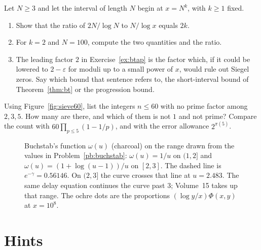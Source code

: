\begin{exercise}[$\star\star$]\label{ex:tworatio}
Let $N\ge3$ and let the interval of length $N$ begin at $x=N^k$, with $k\ge1$ fixed.
\begin{enumerate}[label=(\alph*)]
\item Show that the ratio of $2N/\log N$ to $N/\log x$ equals $2k$.
\item For $k=2$ and $N=100$, compute the two quantities and the ratio.
\item The leading factor $2$ in Exercise~\ref{ex:btap} is the factor which, if it could be lowered to $2-\varepsilon$ for moduli up to a small power of $x$, would rule out Siegel zeros. Say which bound that sentence refers to, the short-interval bound of Theorem~\ref{thm:bt} or the progression bound.
\end{enumerate}
\end{exercise}

\begin{exercise}[$\star$]\label{ex:sift60}
Using Figure~\ref{fig:sieve60}, list the integers $n\le60$ with no prime factor among $2,3,5$. How many are there, and which of them is not $1$ and not prime? Compare the count with $60\prod_{p\le5}(1-1/p)$, and with the error allowance $2^{\pi(5)}$.
\end{exercise}

\begin{figure}[ht]
\centering
{}
\caption{Buchstab's function $\omega(u)$ (charcoal) on the range drawn from the values in Problem~\ref{pb:buchstab}: $\omega(u)=1/u$ on $(1,2]$ and $\omega(u)=(1+\log(u-1))/u$ on $[2,3]$. The dashed line is $e^{-\gamma}=0.56146$. On $(2,3]$ the curve crosses that line at $u=2.483$. The same delay equation continues the curve past $3$; Volume~15 takes up that range. The ochre dots are the proportions $(\log y/x)\Phi(x,y)$ at $x=10^8$.}
\label{fig:buchstab}
\end{figure}

\section{Hints}

